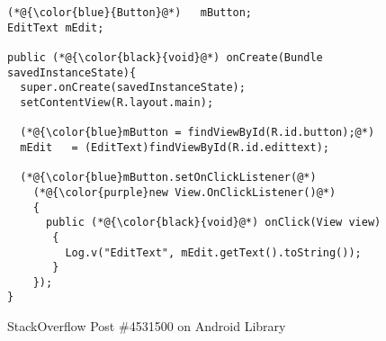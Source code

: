 \begin{figure}[t]
	\centering
\begin{lstlisting}[]
(*@{\color{blue}{Button}@*)   mButton;
EditText mEdit;

public (*@{\color{black}{void}@*) onCreate(Bundle savedInstanceState){
  super.onCreate(savedInstanceState);
  setContentView(R.layout.main);

  (*@{\color{blue}mButton = findViewById(R.id.button);@*)
  mEdit   = (EditText)findViewById(R.id.edittext);

  (*@{\color{blue}mButton.setOnClickListener(@*)
    (*@{\color{purple}new View.OnClickListener()@*)
    {
      public (*@{\color{black}{void}@*) onClick(View view)
       {
         Log.v("EditText", mEdit.getText().toString());
       }
    });
}
\end{lstlisting}
        \vspace{-18pt}
        \caption{StackOverflow Post \#4531500 on Android Library}
        \label{fig:example1}
\end{figure}

